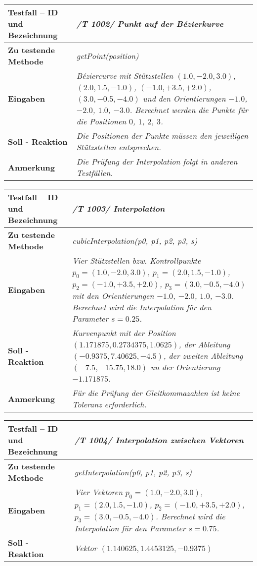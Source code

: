 \begin{longtable}{|p{7cm}|p{10cm}|}
\hline
\textbf{Testfall -- ID und Bezeichnung} & \textit{ /T 1002/ Punkt auf der Bézierkurve} \\
\hline
\textbf{Zu testende Methode} &  \textit{getPoint(position)} \\
\hline
\textbf{Eingaben} & \textit{Béziercurve mit Stützstellen $(1.0, -2.0, 3.0)$,
$(2.0, 1.5, -1.0)$, $(-1.0, +3.5, +2.0)$, $(3.0, -0.5, -4.0)$ und
den Orientierungen $-1.0$, $-2.0$, $1.0$, $-3.0$. Berechnet werden die Punkte für
die Positionen $0$, $1$, $2$, $3$.}\\
\hline
\textbf{Soll - Reaktion} & \textit{Die Positionen der Punkte müssen den
jeweiligen Stützstellen entsprechen.} \\
\hline
\textbf{Anmerkung} & \textit{Die Prüfung der Interpolation folgt in anderen Testfällen.} \\
\hline
\end{longtable}

\begin{longtable}{|p{7cm}|p{10cm}|}
\hline
\textbf{Testfall -- ID und Bezeichnung} & \textit{ /T 1003/ Interpolation} \\
\hline
\textbf{Zu testende Methode} &  \textit{cubicInterpolation(p0, p1, p2, p3, s)} \\
\hline
\textbf{Eingaben} & \textit{Vier Stützstellen bzw. Kontrollpunkte $p_0 = (1.0, -2.0, 3.0)$,
$p_1 = (2.0, 1.5, -1.0)$, $p_2 = (-1.0, +3.5, +2.0)$, $p_3 = (3.0, -0.5, -4.0)$ mit den
Orientierungen $-1.0$, $-2.0$, $1.0$, $-3.0$. Berechnet wird die Interpolation für
den Parameter $s = 0.25$.}\\
\hline
\textbf{Soll - Reaktion} & \textit{Kurvenpunkt mit der Position $(1.171875, 0.2734375, 1.0625)$,
 der Ableitung $(-0.9375,7.40625, -4.5)$, der zweiten Ableitung $(-7.5, -15.75, 18.0)$
 un der Orientierung $-1.171875$.}\\
\hline
\textbf{Anmerkung} & \textit{Für die Prüfung der Gleitkommazahlen ist keine 
Toleranz erforderlich.} \\
\hline
\end{longtable}

\begin{longtable}{|p{7cm}|p{10cm}|}
\hline
\textbf{Testfall -- ID und Bezeichnung} & \textit{ /T 1004/ Interpolation zwischen Vektoren} \\
\hline
\textbf{Zu testende Methode} &  \textit{getInterpolation(p0, p1, p2, p3, s)} \\
\hline
\textbf{Eingaben} & \textit{Vier Vektoren $p_0 = (1.0, -2.0, 3.0)$,
$p_1 = (2.0, 1.5, -1.0)$, $p_2 = (-1.0, +3.5, +2.0)$, $p_3 = (3.0, -0.5, -4.0)$. 
Berechnet wird die Interpolation für den Parameter $s = 0.75$.}\\
\hline
\textbf{Soll - Reaktion} & \textit{Vektor $(1.140625, 1.4453125, -0.9375)$}\\
\hline
\end{longtable}

